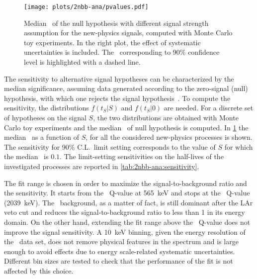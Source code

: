 \begin{figure}
  \centering
  \texttt{[image: plots/2nbb-ana/pvalues.pdf]}
  \caption{%
    Median \pvalue\ of the null hypothesis with different signal strength assumption for
    the new-physics signals, computed with Monte Carlo toy experiments. In the right plot,
    the effect of systematic uncertainties is included. The \pvalue\ corresponding to 90\%
    confidence level is highlighted with a dashed line.
  }\label{fig:2nbb-ana:pvalues}
\end{figure}

The sensitivity to alternative signal hypotheses can be characterized by the median
significance, assuming data generated according to the zero-signal (null) hypothesis, with
which one rejects the signal hypothesis~\cite{Cowan2011}. To compute the sensitivity, the
distributions $f(t_S|S)$ and $f(t_S|0)$ are needed. For a discrete set of hypotheses on
the signal $S$, the two distributions are obtained with Monte Carlo toy experiments and
the median \pvalue\ of null hypothesis is computed. In \cref{fig:2nbb-ana:pvalues} the
median \pvalue\ as a function of $S$, for all the considered new-physics processes is
shown. The sensitivity for 90\% C.L.~limit setting corresponds to the value of $S$ for
which the median \pvalue\ is $0.1$. The limit-setting sensitivities on the half-lives of
the investigated processes are reported in \cref{tab:2nbb-ana:sensitivity}.

The fit range is chosen in order to maximize the signal-to-background ratio and the
sensitivity. It starts from the \Arl\ Q-value at 565~keV and stops at the \nnbb\ Q-value
(2039~keV). The \Arl\ background, as a matter of fact, is still dominant after the LAr
veto cut and reduces the signal-to-background ratio to less than 1 in its energy domain.
On the other hand, extending the fit range above the \nnbb\ Q-value does not improve the
signal sensitivity.
\newpar
A 10~keV binning, given the energy resolution of the \enrBEGeII\ data set, does not
remove physical features in the spectrum and is large enough to avoid effects due to
energy scale-related systematic uncertainties. Different bin sizes are tested
to check that the performance of the fit is not affected by this choice.

\begin{table}
  \centering
  \caption{%
    Sensitivity for 90\% C.L.~limit setting on the half-lives of new physics processes
    contributing to the \nnbb\ event distribution, before and after the inclusion of
    systematic uncertainties. The results are extracted from toy Monte Carlo data sets.
  }\label{tab:2nbb-ana:sensitivity}
  
\end{table}


